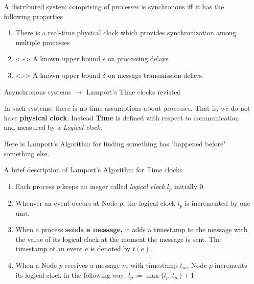 \documentclass[../document.tex]{subfiles}
\begin{document}
\begin{frame}
	\begin{definition}
		A distributed system comprising of processes is synchronous iff it has the following properties\footnotemark
		\begin{enumerate}
			\item<+-> There is a real-time physical clock which provides synchronization among multiple processes
			\item<.-> A known upper bound $\epsilon$ on processing delays
			\item<.-> A known upper bound $\delta$ on message transmission delays.
		\end{enumerate}
	\end{definition}


\end{frame}
\begin{frame}{Asynchronous systems $\rightarrow$ Lamport's Time clocks revisted}
	\small
	\begin{definition}
		In such systems, there is no time assumptions about processes. That is, we do not have \textbf{physical clock}. Instead \textbf{Time} is defined with respect to communication and measured by a \textit{Logical clock}.  
	\end{definition}
	 {Here is Lamport's Algorithm for finding something has "happened before" something else.}
\end{frame}


\begin{frame}{A brief description of Lamport's Algorithm for Time clocks}
	\begin{enumerate}
		\item <+-> Each process $p$ keeps an ineger called \textit{logical clock $l_p$} initially 0.
		\item <+-> Whenver an event occurs at Node $p$, the logical clock $l_p$ is incremented by one unit.
		\item <+-> When a process \textbf{sends a message,} it adds a timestamp to the message with the value of its logical clock at the moment the message is sent. The timestamp of an event $e$ is denoted by $t(e)$.
		\item<+-> When a Node $p$ receives a message $m$ with timestamp $t_m$, Node $p$ increments its logical clock in the following way: $l_p := \max\{l_p, t_m\} + 1$
	\end{enumerate}
\end{frame}
\end{document}
